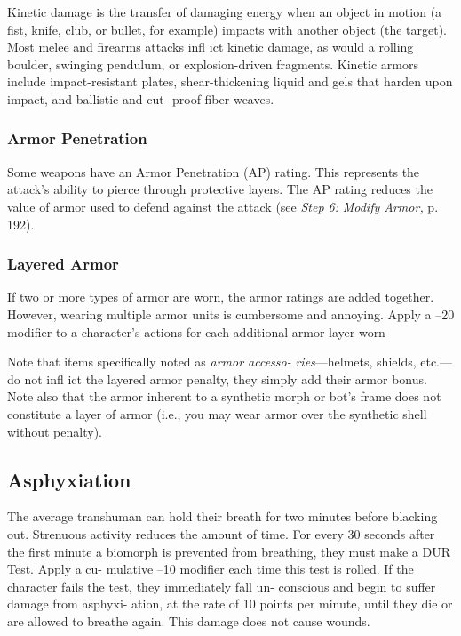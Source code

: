 Kinetic damage is the transfer of damaging energy 
when an object in motion (a fist, knife, club, or bullet, 
for example) impacts with another object (the target). 
Most melee and firearms attacks infl ict kinetic damage, 
as would a rolling boulder, swinging pendulum, or 
explosion-driven fragments. Kinetic armors include 
impact-resistant plates, shear-thickening liquid and 
gels that harden upon impact, and ballistic and cut-
proof fiber weaves.

\subsubsection{Armor Penetration}

Some weapons have an Armor Penetration (AP) rating. 
This represents the attack's ability to pierce through 
protective layers. The AP rating reduces the value of 
armor used to defend against the attack (see \textit{Step 6: }
\textit{Modify Armor,} p. 192).

\subsubsection{Layered Armor}

If two or more types of armor are worn, the armor 
ratings are added together. However, wearing multiple 
armor units is cumbersome and annoying. Apply a –20 
modifier to a character's actions for each additional 
armor layer worn

Note that items specifically noted as \textit{armor accesso-}
\textit{ries}—helmets, shields, etc.—do not infl ict the layered 
armor penalty, they simply add their armor bonus. 
Note also that the armor inherent to a synthetic 
morph or bot's frame does not constitute a layer of 
armor (i.e., you may wear armor over the synthetic 
shell without penalty).

\subsection{Asphyxiation}

The average transhuman can hold their breath for 
two minutes before blacking out. Strenuous activity 
reduces the amount of time. For every 30 seconds 
after the first minute a biomorph is prevented from 
breathing, they must make a DUR Test. Apply a cu-
mulative –10 modifier each time this test is rolled. If 
the character fails the test, they immediately fall un-
conscious and begin to suffer damage from asphyxi-
ation, at the rate of 10 points per minute, until they 
die or are allowed to breathe again. This damage does 
not cause wounds.

